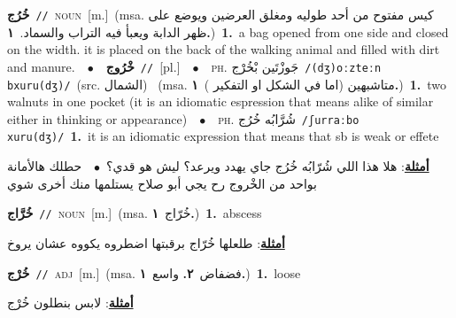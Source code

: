 \documentclass[10pt,a4paper,twoside]{article} %
\begin{document}
\begin{multicols}{2}
{\setlength\topsep{0pt}\textbf{\foreignlanguage{arabic}{خُرُج}}\ {\color{gray}\texttt{//}\color{black}}\ \textsc{noun}\ [m.]\ \color{gray}(msa. \foreignlanguage{arabic}{كيس مفتوح من أحد طوليه ومغلق العرضين ويوضع على ظهر الدابة ويعبأ فيه التراب والسماد.}~\foreignlanguage{arabic}{\textbf{١.}})\color{black}\ \textbf{1.}~a bag opened from one side and closed on the width. it is placed on the back of the walking animal and filled with dirt and manure.\ \ $\bullet$\ \ \setlength\topsep{0pt}\textbf{\foreignlanguage{arabic}{خْرُوج}}\ {\color{gray}\texttt{//}\color{black}}\ [pl.]\ \ $\bullet$\ \ \textsc{ph.} \color{gray} \foreignlanguage{arabic}{جَوزْتَين بْخُرْج}\color{black}\ {\color{gray}\texttt{/{\sffamily (dʒ)oːzteːn bxuru(dʒ)}/}\color{black}}\ \color{gray}(src. \foreignlanguage{arabic}{الشمال})\color{black}\ \color{gray} (msa. \foreignlanguage{arabic}{متاشبهين (اما في الشكل او التفكير )}~\foreignlanguage{arabic}{\textbf{١.}})\color{black}\ \textbf{1.}~two walnuts in one pocket (it is an idiomatic espression that means alike of similar either in thinking or appearance)\ \ $\bullet$\ \ \textsc{ph.} \color{gray} \foreignlanguage{arabic}{شُرَّابُه خُرُج}\color{black}\ {\color{gray}\texttt{/{\sffamily ʃurraːbo xuru(dʒ)}/}\color{black}}\ \textbf{1.}~it is an idiomatic expression that means that sb is weak or effete\  \begin{flushright}\color{gray}\foreignlanguage{arabic}{\textbf{\underline{\foreignlanguage{arabic}{أمثلة}}}: هلا هذا اللي شُرّابُه خُرُج جاي يهدد ويرعد؟ ليش هو قدي؟\ $\bullet$\ \  حطلك هالأمانة بواحد من الخْروج رح يجي أبو صلاح يستلمها منك أخرى شوي}\end{flushright}\color{black}} \vspace{2mm}

{\setlength\topsep{0pt}\textbf{\foreignlanguage{arabic}{خُرَّاج}}\ {\color{gray}\texttt{//}\color{black}}\ \textsc{noun}\ [m.]\ \color{gray}(msa. \foreignlanguage{arabic}{خُرّاج}~\foreignlanguage{arabic}{\textbf{١.}})\color{black}\ \textbf{1.}~abscess\  \begin{flushright}\color{gray}\foreignlanguage{arabic}{\textbf{\underline{\foreignlanguage{arabic}{أمثلة}}}: طلعلها خُرّاج برقبتها اضطروه يكووه عشان يروخ}\end{flushright}\color{black}} \vspace{2mm}

{\setlength\topsep{0pt}\textbf{\foreignlanguage{arabic}{خُرْج}}\ {\color{gray}\texttt{//}\color{black}}\ \textsc{adj}\ [m.]\ \color{gray}(msa. \foreignlanguage{arabic}{فضفاض}~\foreignlanguage{arabic}{\textbf{٢.}}  \foreignlanguage{arabic}{واسع}~\foreignlanguage{arabic}{\textbf{١.}})\color{black}\ \textbf{1.}~loose\  \begin{flushright}\color{gray}\foreignlanguage{arabic}{\textbf{\underline{\foreignlanguage{arabic}{أمثلة}}}: لابس بنطلون خُرْج}\end{flushright}\color{black}} \vspace{2mm}


\end{multicols}
\end{document}
